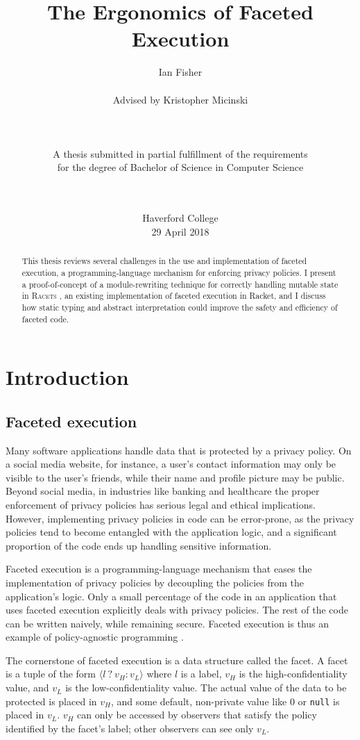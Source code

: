 \documentclass{article}
\title{The Ergonomics of Faceted Execution}
\author{Ian Fisher \\ \\ Advised by Kristopher Micinski \\ \\ \\ \\ A thesis submitted in partial fulfillment of the requirements \\ for the degree of Bachelor of Science in Computer Science \\ \\ \\}
\date{Haverford College \\ 29 April 2018}
\begin{document}
\maketitle

\begin{abstract}
	This thesis reviews several challenges in the use and implementation of faceted execution, a programming-language mechanism for enforcing privacy policies. I present a proof-of-concept of a module-rewriting technique for correctly handling mutable state in \textsc{Racets} \cite{racets}, an existing implementation of faceted execution in Racket, and I discuss how static typing and abstract interpretation could improve the safety and efficiency of faceted code.
\end{abstract}

\newpage
\tableofcontents
\newpage



\section{Introduction\label{sec:intro}}
\subsection{Faceted execution\label{sec:facets}}
Many software applications handle data that is protected by a privacy policy. On a social media website, for instance, a user's contact information may only be visible to the user's friends, while their name and profile picture may be public. Beyond social media, in industries like banking and healthcare the proper enforcement of privacy policies has serious legal and ethical implications. However, implementing privacy policies in code can be error-prone, as the privacy policies tend to become entangled with the application logic, and a significant proportion of the code ends up handling sensitive information.

Faceted execution is a programming-language mechanism that eases the implementation of privacy policies by decoupling the policies from the application's logic. Only a small percentage of the code in an application that uses faceted execution explicitly deals with privacy policies. The rest of the code can be written naively, while remaining secure. Faceted execution is thus an example of policy-agnostic programming \cite{faceted}.

The cornerstone of faceted execution is a data structure called the facet. A facet is a tuple of the form $\langle l\ ?\ v_H : v_L \rangle$ where $l$ is a label, $v_H$ is the high-confidentiality value, and $v_L$ is the low-confidentiality value. The actual value of the data to be protected is placed in $v_H$, and some default, non-private value like $0$ or \texttt{null} is placed in $v_L$. $v_H$ can only be accessed by observers that satisfy the policy identified by the facet's label; other observers can see only $v_L$.
\end{document}
